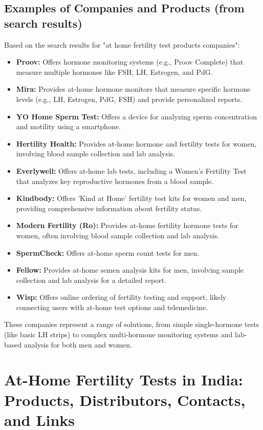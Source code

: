 \documentclass{article}
\begin{document}
\subsection{Examples of Companies and Products (from search results)}

Based on the search results for "at home fertility test products companies":
\begin{itemize}
    \item \textbf{Proov:} Offers hormone monitoring systems (e.g., Proov Complete) that measure multiple hormones like FSH, LH, Estrogen, and PdG.
    \item \textbf{Mira:} Provides at-home hormone monitors that measure specific hormone levels (e.g., LH, Estrogen, PdG, FSH) and provide personalized reports.
    \item \textbf{YO Home Sperm Test:} Offers a device for analyzing sperm concentration and motility using a smartphone.
    \item \textbf{Hertility Health:} Provides at-home hormone and fertility tests for women, involving blood sample collection and lab analysis.
    \item \textbf{Everlywell:} Offers at-home lab tests, including a Women's Fertility Test that analyzes key reproductive hormones from a blood sample.
    \item \textbf{Kindbody:} Offers 'Kind at Home' fertility test kits for women and men, providing comprehensive information about fertility status.
    \item \textbf{Modern Fertility (Ro):} Provides at-home fertility hormone tests for women, often involving blood sample collection and lab analysis.
    \item \textbf{SpermCheck:} Offers at-home sperm count tests for men.
    \item \textbf{Fellow:} Provides at-home semen analysis kits for men, involving sample collection and lab analysis for a detailed report.
    \item \textbf{Wisp:} Offers online ordering of fertility testing and support, likely connecting users with at-home test options and telemedicine.
\end{itemize}

These companies represent a range of solutions, from simple single-hormone tests (like basic LH strips) to complex multi-hormone monitoring systems and lab-based analysis for both men and women.

\section{At-Home Fertility Tests in India: Products, Distributors, Contacts, and Links}
\end{document}
